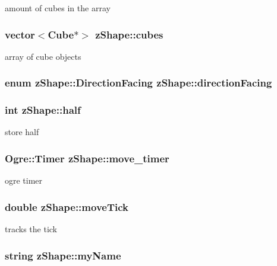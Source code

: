 amount of cubes in the array \hypertarget{classz_shape_aa0d1a3c2b46801c1064c43d33094f29e}{
\subsubsection[{cubes}]{\setlength{\rightskip}{0pt plus 5cm}vector$<${\bf Cube}$\ast$$>$ z\-Shape\-::cubes}}\label{classz_shape_aa0d1a3c2b46801c1064c43d33094f29e}
array of cube objects \hypertarget{classz_shape_a22d2f5fca91a1b455a17d5e8fbe4a280}{
\subsubsection[{direction\-Facing}]{\setlength{\rightskip}{0pt plus 5cm}enum {\bf z\-Shape\-::\-Direction\-Facing}  z\-Shape\-::direction\-Facing}}\label{classz_shape_a22d2f5fca91a1b455a17d5e8fbe4a280}
\hypertarget{classz_shape_a6fb508e0180de23b90db911b1bb97003}{
\subsubsection[{half}]{\setlength{\rightskip}{0pt plus 5cm}int z\-Shape\-::half}}\label{classz_shape_a6fb508e0180de23b90db911b1bb97003}
store half \hypertarget{classz_shape_a56e2cca0a696cf28fa4244ce20267fb4}{
\subsubsection[{move\-\_\-timer}]{\setlength{\rightskip}{0pt plus 5cm}Ogre\-::\-Timer z\-Shape\-::move\-\_\-timer}}\label{classz_shape_a56e2cca0a696cf28fa4244ce20267fb4}
ogre timer \hypertarget{classz_shape_a06a862d298b4fe36236834a39af1d7b4}{
\subsubsection[{move\-Tick}]{\setlength{\rightskip}{0pt plus 5cm}double z\-Shape\-::move\-Tick}}\label{classz_shape_a06a862d298b4fe36236834a39af1d7b4}
tracks the tick \hypertarget{classz_shape_a751cf070b6e1b1ee3936020f01beeab3}{
\subsubsection[{my\-Name}]{\setlength{\rightskip}{0pt plus 5cm}string z\-Shape\-::my\-Name}}\label{classz_shape_a751cf070b6e1b1ee3936020f01beeab3}

